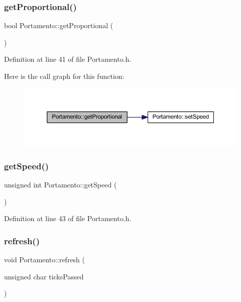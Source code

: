 \subsubsection{\texorpdfstring{get\+Proportional()}{getProportional()}}
{\footnotesize\ttfamily bool Portamento\+::get\+Proportional (\begin{DoxyParamCaption}{ }\end{DoxyParamCaption})\hspace{0.3cm}{\ttfamily [inline]}}



Definition at line 41 of file Portamento.\+h.

Here is the call graph for this function\+:
\nopagebreak
\begin{figure}[H]
\begin{center}
\leavevmode
\includegraphics[width=350pt]{d4/d10/class_portamento_a2cc6e550905558daac49cbef693c62fb_cgraph}
\end{center}
\end{figure}
\mbox{\label{class_portamento_a6542d6becc564aaec446ec86104a8c2d}} 
\subsubsection{\texorpdfstring{get\+Speed()}{getSpeed()}}
{\footnotesize\ttfamily unsigned int Portamento\+::get\+Speed (\begin{DoxyParamCaption}{ }\end{DoxyParamCaption})\hspace{0.3cm}{\ttfamily [inline]}}



Definition at line 43 of file Portamento.\+h.

\mbox{\label{class_portamento_a4a5430c4e0561f9b37bbffdcbb936c43}} 
\subsubsection{\texorpdfstring{refresh()}{refresh()}}
{\footnotesize\ttfamily void Portamento\+::refresh (\begin{DoxyParamCaption}\item[{unsigned char}]{ticks\+Passed }\end{DoxyParamCaption})}




